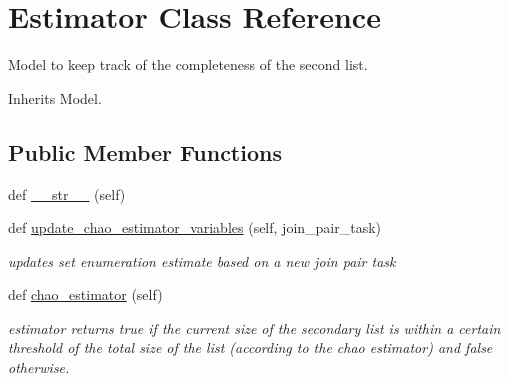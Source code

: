 \hypertarget{classjoinapp_1_1models_1_1estimator_1_1_estimator}{}\section{Estimator Class Reference}
\label{classjoinapp_1_1models_1_1estimator_1_1_estimator}


Model to keep track of the completeness of the second list.  




Inherits Model.

\subsection*{Public Member Functions}
\begin{DoxyCompactItemize}
\item 
def \mbox{\hyperlink{classjoinapp_1_1models_1_1estimator_1_1_estimator_a23e8041ce1015febe4fdace3225714f9}{\+\_\+\+\_\+str\+\_\+\+\_\+}} (self)
\item 
def \mbox{\hyperlink{classjoinapp_1_1models_1_1estimator_1_1_estimator_aba71870a49baf189ad93170acd58d0de}{update\+\_\+chao\+\_\+estimator\+\_\+variables}} (self, join\+\_\+pair\+\_\+task)
\begin{DoxyCompactList}\small\item\em updates set enumeration estimate based on a new join pair task \end{DoxyCompactList}\item 
def \mbox{\hyperlink{classjoinapp_1_1models_1_1estimator_1_1_estimator_a582efaf16c8455e890ef61101a863966}{chao\+\_\+estimator}} (self)
\begin{DoxyCompactList}\small\item\em estimator returns true if the current size of the secondary list is within a certain threshold of the total size of the list (according to the chao estimator) and false otherwise. \end{DoxyCompactList}\end{DoxyCompactItemize}
